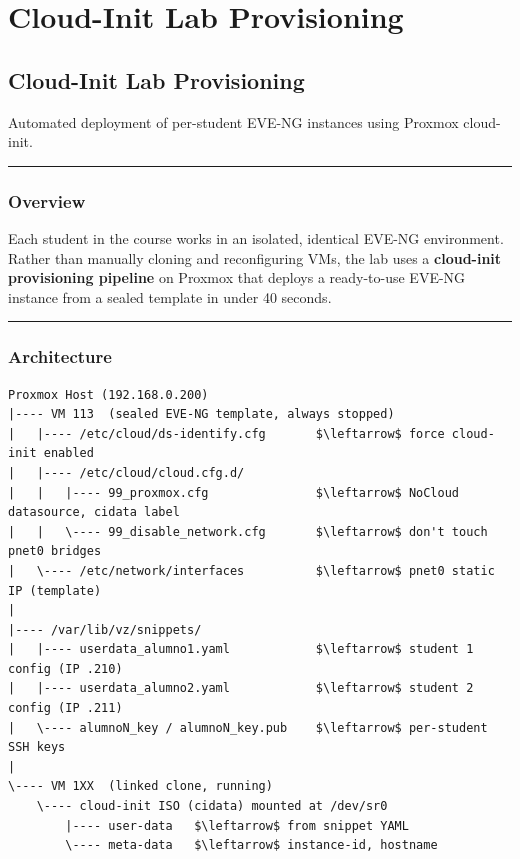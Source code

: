 \chapter{Cloud-Init Lab Provisioning}

\section{Cloud-Init Lab Provisioning}

Automated deployment of per-student EVE-NG instances using Proxmox cloud-init.

\begin{center}\rule{0.5\linewidth}{0.5pt}\end{center}

\subsection{Overview}

Each student in the course works in an isolated, identical EVE-NG environment. Rather than manually cloning and reconfiguring VMs, the lab uses a \textbf{cloud-init provisioning pipeline} on Proxmox that deploys a ready-to-use EVE-NG instance from a sealed template in under 40 seconds.

\begin{center}\rule{0.5\linewidth}{0.5pt}\end{center}

\subsection{Architecture}

\begin{lstlisting}
Proxmox Host (192.168.0.200)
|---- VM 113  (sealed EVE-NG template, always stopped)
|   |---- /etc/cloud/ds-identify.cfg       $\leftarrow$ force cloud-init enabled
|   |---- /etc/cloud/cloud.cfg.d/
|   |   |---- 99_proxmox.cfg               $\leftarrow$ NoCloud datasource, cidata label
|   |   \---- 99_disable_network.cfg       $\leftarrow$ don't touch pnet0 bridges
|   \---- /etc/network/interfaces          $\leftarrow$ pnet0 static IP (template)
|
|---- /var/lib/vz/snippets/
|   |---- userdata_alumno1.yaml            $\leftarrow$ student 1 config (IP .210)
|   |---- userdata_alumno2.yaml            $\leftarrow$ student 2 config (IP .211)
|   \---- alumnoN_key / alumnoN_key.pub    $\leftarrow$ per-student SSH keys
|
\---- VM 1XX  (linked clone, running)
    \---- cloud-init ISO (cidata) mounted at /dev/sr0
        |---- user-data   $\leftarrow$ from snippet YAML
        \---- meta-data   $\leftarrow$ instance-id, hostname
\end{lstlisting}

